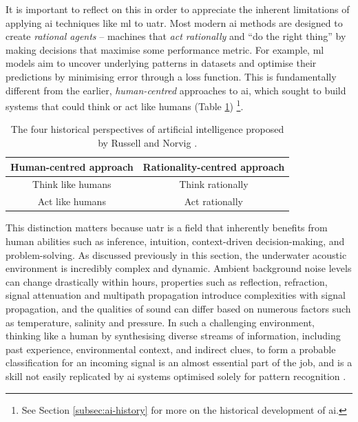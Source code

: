 It is important to reflect on this in order to appreciate the inherent limitations of applying \acrshort{ai} techniques like \acrlong{ml} to \acrshort{uatr}. Most modern \acrshort{ai} methods are designed to create \textit{rational agents} -- machines that \textit{act rationally} and ``do the right thing'' by making decisions that maximise some performance metric. For example, \acrlong{ml} models aim to uncover underlying patterns in datasets and optimise their predictions by minimising error through a loss function. This is fundamentally different from the earlier, \textit{human-centred} approaches to \acrshort{ai}, which sought to build systems that could think or act like humans (Table \ref{tab:ai-approaches}) \cite{carnegie_mellon_university_human_2001, russell_artificial_2021}\footnote{See Section \ref{subsec:ai-history} for more on the historical development of \acrshort{ai}.}.

\begin{table}[htbp]
\centering
\begin{tabular}{cc}
\toprule
\textbf{Human-centred approach} & \textbf{Rationality-centred approach} \\ \midrule
Think like humans & Think rationally \\
Act like humans & Act rationally \\ \bottomrule
\end{tabular}
\caption{The four historical perspectives of artificial intelligence proposed by Russell and Norvig \cite{russell_artificial_2021}.}
\label{tab:ai-approaches}
\end{table}

This distinction matters because \acrshort{uatr} is a field that inherently benefits from human abilities such as inference, intuition, context-driven decision-making, and problem-solving. As discussed previously in this section, the underwater acoustic environment is incredibly complex and dynamic. Ambient background noise levels can change drastically within hours, properties such as reflection, refraction, signal attenuation and multipath propagation introduce complexities with signal propagation, and the qualities of sound can differ based on numerous factors such as temperature, salinity and pressure. In such a challenging environment, thinking like a human by synthesising diverse streams of information, including past experience, environmental context, and indirect clues, to form a probable classification for an incoming signal is an almost essential part of the job, and is a skill not easily replicated by \acrshort{ai} systems optimised solely for pattern recognition \cite{kamal_deep_2013}.

